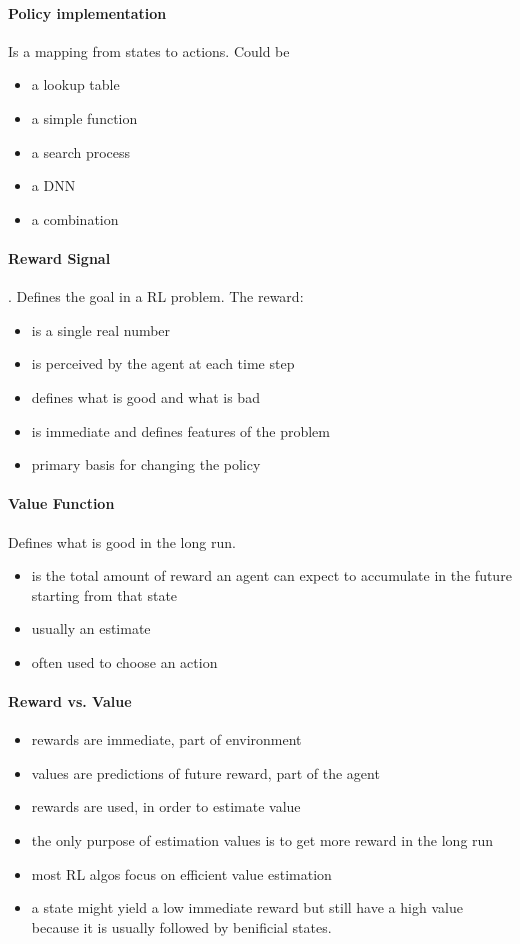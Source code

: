 \documentclass[10pt,a4paper]{article}
\begin{document}
\paragraph{Policy implementation} Is a mapping from states to actions. Could be
\begin{itemize}
\item a lookup table
\item a simple function
\item a search process
\item a DNN
\item a combination
\end{itemize}

\paragraph{Reward Signal}. Defines the goal in a RL problem. The reward:
\begin{itemize}
\item is a single real number
\item is perceived by the agent at each time step
\item defines what is good and what is bad
\item is immediate and defines features of the problem
\item primary basis for changing the policy
\end{itemize}

\paragraph{Value Function} Defines what is good in the long run. 
\begin{itemize}
\item is the total amount of reward an agent can expect to accumulate in the future starting from that state
\item usually an estimate
\item often used to choose an action
\end{itemize}

\paragraph{Reward vs. Value}
\begin{itemize}
\item rewards are immediate, part of environment
\item values are predictions of future reward, part of the agent
\item rewards are used, in order to estimate value
\item the only purpose of estimation values is to get more reward in the long run
\item most RL algos focus on efficient value estimation
\item a state might yield a low immediate reward but still have a high value because it is usually followed by benificial states.
\end{itemize}
\end{document}
